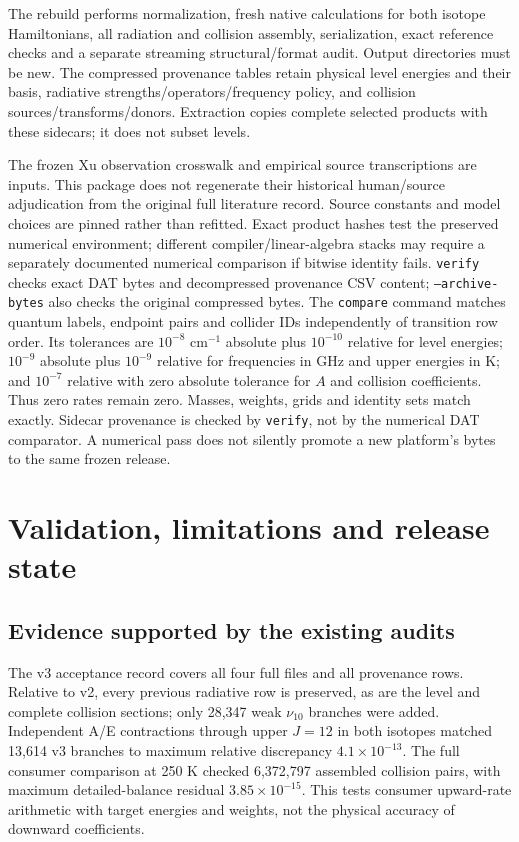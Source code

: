 \documentclass[11pt,a4paper]{article}
\begin{document}
The rebuild performs normalization, fresh native calculations for both isotope
Hamiltonians, all radiation and collision assembly, serialization, exact
reference checks and a separate streaming structural/format audit. Output
directories must be new. The compressed provenance tables retain physical
level energies and their basis, radiative strengths/operators/frequency policy,
and collision sources/transforms/donors. Extraction copies complete selected
products with these sidecars; it does not subset levels.

The frozen Xu observation crosswalk and empirical source transcriptions are
inputs. This package does not regenerate their historical human/source
adjudication from the original full literature record. Source constants and
model choices are pinned rather than refitted. Exact product hashes test the
preserved numerical environment; different compiler/linear-algebra stacks
may require a separately documented numerical comparison if bitwise identity
fails. \texttt{verify} checks exact DAT bytes and decompressed provenance CSV
content; \texttt{--archive-bytes} also checks the original compressed bytes.
The \texttt{compare} command matches quantum labels, endpoint pairs and
collider IDs independently of transition row order. Its tolerances are
$10^{-8}$ cm$^{-1}$ absolute plus $10^{-10}$ relative for level energies;
$10^{-9}$ absolute plus $10^{-9}$ relative for frequencies in GHz and upper
energies in K; and $10^{-7}$ relative with zero absolute tolerance for $A$
and collision coefficients. Thus zero rates remain zero. Masses, weights,
grids and identity sets match exactly. Sidecar provenance is checked by
\texttt{verify}, not by the numerical DAT comparator. A numerical pass does
not silently promote a new platform's bytes to the same frozen release.

\section{Validation, limitations and release state}
\subsection{Evidence supported by the existing audits}
The v3 acceptance record covers all four full files and all provenance rows.
Relative to v2, every previous radiative row is preserved, as are the level
and complete collision sections; only 28,347 weak $\nu_{10}$ branches were
added. Independent A/E contractions through upper $J=12$ in both isotopes
matched 13,614 v3 branches to maximum relative discrepancy
$4.1\times10^{-13}$. The full consumer comparison at 250 K checked
6,372,797 assembled collision pairs, with maximum detailed-balance residual
$3.85\times10^{-15}$. This tests consumer upward-rate arithmetic with target
energies and weights, not the physical accuracy of downward coefficients.
\end{document}
